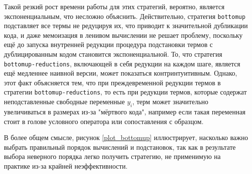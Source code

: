 \documentclass[../thesis.tex]{subfiles}
\begin{document}
Такой резкий рост времени работы для этих стратегий, вероятно, является экспоненциальным, что несложно объяснить. Действительно, стратегия \texttt{bottomup} подставляет все термы не редуцируя их, что приводит к значительной дубликации кода, и даже мемоизация в ленивом вычислении не решает проблему, поскольку ещё до запуска внутренней редукции процедура подстановки термов с дублицированным кодом становится экспоненциальной. То, что стратегия \texttt{bottomup-reductions}, включающей в себя редукции на каждом шаге, является ещё медленнее наивной версии, может показаться контринтуитивным. Однако, этот факт объясняется тем, что при преждевременной редукции термов в стратегии \texttt{bottomup-reductions}, то есть при редукции термов, которые содержат неподставленные свободные переменные $y_i$, терм может значительно увеличиваться в размерах из-за "мёртвого кода", например если такая переменная стоит в голове условного оператора или сопоставления с образцом. 

В более общем смысле, рисунок \ref{plot_bottomup} иллюстрирует, насколько важно выбрать правильный порядок вычислений и подстановок, так как в результате выбора неверного порядка легко получить стратегию, не применимую на практике из-за крайней неэффективности.
\end{document}
